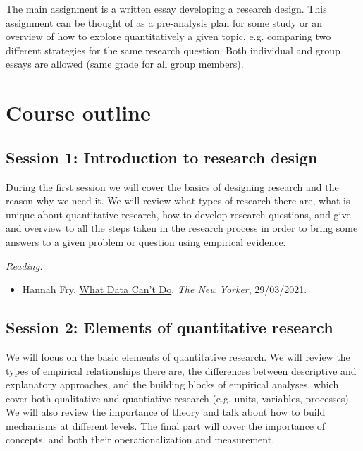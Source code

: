 \documentclass[12pt, a4paper]{article}
\begin{document}
The main assignment is a written essay developing a research design. This assignment can be thought of as a pre-analysis plan for some study or an overview of how to explore quantitatively a given topic, e.g. comparing two different strategies for the same research question. Both individual and group essays are allowed (same grade for all group members).

\newpage
\section{Course outline}

\subsection*{Session 1: Introduction to research design}

During the first session we will cover the basics of designing research and the reason why we need it. We will review what types of research there are, what is unique about quantitative research, how to develop research questions, and give and overview to all the steps taken in the research process in order to bring some answers to a given problem or question using empirical evidence.

\vspace{15pt}\noindent\textit{Reading:}

\begin{itemize}
  \item Hannah Fry. \href{https://www.newyorker.com/magazine/2021/03/29/what-data-cant-do}{What Data Can't Do}. \textit{The New Yorker}, 29/03/2021.
\end{itemize}


\subsection*{Session 2: Elements of quantitative research}

We will focus on the basic elements of quantitative research. We will review the types of empirical relationships there are, the differences between descriptive and explanatory approaches, and the building blocks of empirical analyses, which cover both qualitative and quantiative research (e.g. units, variables, processes). We will also review the importance of theory and talk about how to build mechanisms at different levels. The final part will cover the importance of concepts, and both their operationalization and measurement.
\end{document}
